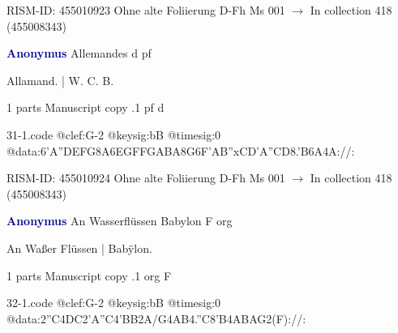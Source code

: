 \documentclass[twocolumn]{book}
\begin{document}
\newline RISM-ID: 455010923
\newline Ohne alte Foliierung
\newline D-Fh  Ms 001
\newline $\rightarrow$ In collection 418 (455008343)

\newline \par \vspace{7pt} \textcolor{darkblue}{\textbf{Anonymus  }}
\newline Allemandes  d  
\newline pf
\newline \begin{itshape}[f.57v, at left:] Allamand. | W. C. B.\end{itshape} 
\newline \textcolor{darkblue}{}  1 parts  
\newline Manuscript copy
.1  pf  d  
\begin{filecontents*}{31-1.code}
@clef:G-2
@keysig:bB
@timesig:0
@data:6'A{''DEFG}{8A6EG}{FFGA}{BA8G}{6F'AB''xC}{D'A''CD}{8.'B6A}4A://:
\end{filecontents*}
\newline
%

\newline RISM-ID: 455010924
\newline Ohne alte Foliierung
\newline D-Fh  Ms 001
\newline $\rightarrow$ In collection 418 (455008343)

\newline \par \vspace{7pt} \textcolor{darkblue}{\textbf{Anonymus  }}
\newline An Wasserflüssen Babylon  F  
\newline org
\newline \begin{itshape}[f.33v, at left:] An Waßer Flüssen | Babÿlon.\end{itshape} 
\newline \textcolor{darkblue}{}  1 parts  
\newline Manuscript copy
.1  org  F  
\begin{filecontents*}{32-1.code}
@clef:G-2
@keysig:bB
@timesig:0
@data:2''C4DC2'A''C4'BB2A/G4AB4.''C8'B4ABAG2(F)://:
\end{filecontents*}
\newline
%
\end{document}
